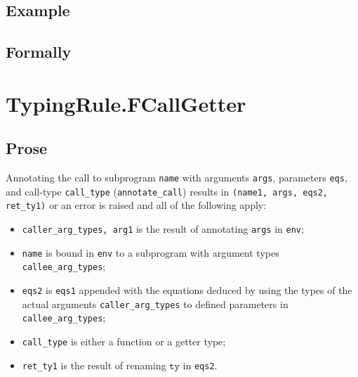 \documentclass{book}
\newcommand\tty[0]{\texttt{ty}}
\begin{document}
\begin{itemize}
  \subsection{Example}



\begin{emptyformal}
    \subsection{Formally}
\end{emptyformal}


\section{TypingRule.FCallGetter \label{sec:TypingRule.FCallGetter}}

  \subsection{Prose}
  Annotating the call to subprogram \texttt{name} with arguments \texttt{args},
  parameters \texttt{eqs}, and call-type \texttt{call\_type}
  (\texttt{annotate\_call}) results in \texttt{(name1, args, eqs2, ret\_ty1)}
  or an error is raised and all of the following apply:
   \begin{itemize}
   \item \texttt{caller\_arg\_types, arg1} is the result of annotating \texttt{args} in \texttt{env};
   \item \texttt{name} is bound in \texttt{env} to a subprogram with argument types
      \\ \texttt{callee\_arg\_types};
   \item \texttt{eqs2} is \texttt{eqs1} appended with the equations deduced by
     using the types of the actual arguments \texttt{caller\_arg\_types} to
     defined parameters in \\ \texttt{callee\_arg\_types};
   \item \texttt{call\_type} is either a function or a getter type;
   \item \texttt{ret\_ty1} is the result of renaming $\tty$ in \texttt{eqs2}.
   \end{itemize}


\end{itemize}
\end{document}
